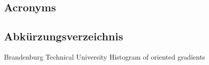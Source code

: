 %
%
%
%
\begin{en}
\chapter{Acronyms}
\end{en}
\begin{de}
\chapter{Abk\"urzungsverzeichnis}
\end{de}
\label{sec:acronyms}
%
\begin{multicols}{2}
\begin{acronym}[BTU]		%
%
%	
	 {Brandenburg Technical University}
	 {Histogram of oriented gradients}
%	
%	
\end{acronym}
\end{multicols}
%
%
%
